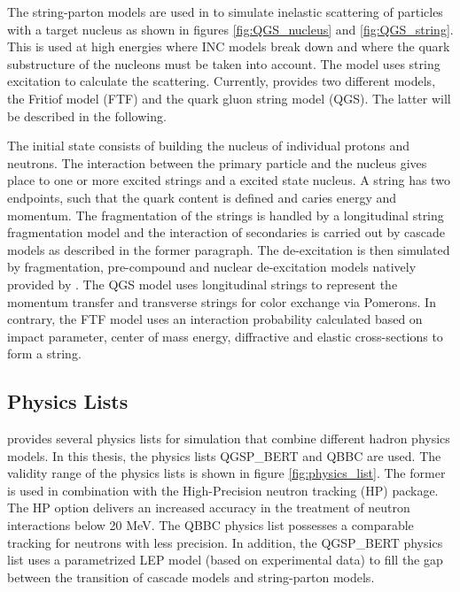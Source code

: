 The string-parton models \cite{Folger2003} are used in \geant to simulate inelastic scattering of particles with a target nucleus as shown in figures \ref{fig:QGS_nucleus} and \ref{fig:QGS_string}. This is used at high energies where INC models break down and where the quark substructure of the nucleons must be taken into account. The model uses string excitation to calculate the scattering. Currently, \geant provides two different models, the Fritiof model (FTF) and the quark gluon string model (QGS). The latter will be described in the following.

The initial state consists of building the nucleus of individual protons and neutrons. The interaction between the primary particle and the nucleus gives place to one or more excited strings and a excited state nucleus. A string has two endpoints, such that the quark content is defined and caries energy and momentum. The fragmentation of the strings is handled by a longitudinal string fragmentation model and the interaction of secondaries is carried out by cascade models as described in the former paragraph. The de-excitation is then simulated by fragmentation, pre-compound and nuclear de-excitation models natively provided by \geant. The QGS model uses longitudinal strings to represent the momentum transfer and transverse strings for color exchange via Pomerons. In contrary, the FTF model uses an interaction probability calculated based on impact parameter, center of mass energy, diffractive and elastic cross-sections to form a string.

\subsection{\geant Physics Lists}

\geant provides several physics lists for simulation that combine different hadron physics models. In this thesis, the physics lists QGSP\_BERT and QBBC are used. The validity range of the physics lists is shown in figure \ref{fig:physics_list}. The former is used in combination with the High-Precision neutron tracking (HP) package. The HP option delivers an increased accuracy in the treatment of neutron interactions below 20 MeV. The QBBC physics list possesses a comparable tracking for neutrons with less precision.
In addition, the QGSP\_BERT physics list uses a parametrized LEP model (based on experimental data) to fill the gap between the transition of cascade models and string-parton models.

